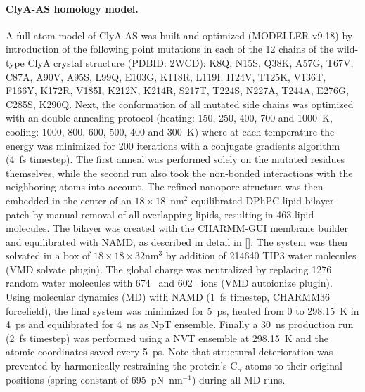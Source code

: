 \documentclass[journal=ancac3,manuscript=article,etalmode=truncate,maxauthors=0,layout=twocolumn]{achemso}
\begin{document}
\paragraph{ClyA-AS homology model.} A full atom model of ClyA-AS\cite{Soskine-2013} was built and optimized
(MODELLER v9.18\cite{Sali-1993}) by introduction of the following point mutations in each of the 12 chains of the wild-type ClyA crystal structure (PDBID: 2WCD\cite{Mueller-2009}): K8Q, N15S, Q38K, A57G, T67V, C87A, A90V, A95S, L99Q, E103G, K118R, L119I, I124V, T125K, V136T, F166Y, K172R, V185I, K212N, K214R, S217T, T224S, N227A, T244A, E276G, C285S, K290Q. Next, the conformation of all mutated side chains was optimized with an double annealing protocol (heating: 150, 250, 400, 700 and 1000~K, cooling: 1000, 800, 600, 500, 400 and 300~K) where at each temperature the energy was minimized for 200 iterations with a conjugate gradients algorithm (4~fs timestep).\cite{Shanno-1980} The first anneal was performed solely on the mutated residues themselves, while the second run also took the non-bonded interactions with the neighboring atoms into account. The refined nanopore structure was then embedded in the center of an $18\times18$~nm$^2$ equilibrated DPhPC lipid bilayer patch by manual removal of all overlapping lipids, resulting in 463 lipid molecules. The bilayer was created with the CHARMM-GUI\cite{Jo-2008} membrane builder\cite{Lee-2016} and equilibrated with NAMD\cite{Phillips-2005}, as described in detail in []. The system was then solvated in a box of $18\times18\times32\text{nm}^3$ by addition of 214640 TIP3 water molecules (VMD solvate plugin). The global charge was neutralized by replacing 1276 random water molecules with 674 \Na\ and 602 \Cl\ ions (VMD autoionize plugin).\cite{Humphrey-1996} Using molecular dynamics (MD) with NAMD (1~fs timestep, CHARMM36 forcefield\cite{Best-2012}), the final system was minimized for 5~ps, heated from 0 to 298.15~K in 4~ps and equilibrated for 4~ns as NpT ensemble.\cite{Aksimentiev-2005} Finally a 30~ns production run (2~fs timestep) was performed using a NVT ensemble at 298.15~K and the atomic coordinates saved every 5~ps. Note that structural deterioration was prevented by harmonically restraining the protein's C$_\alpha$ atoms to their original positions (spring constant of 695~pN~nm$^{-1}$) during all MD runs.\cite{Bhattacharya-2011}
\end{document}
